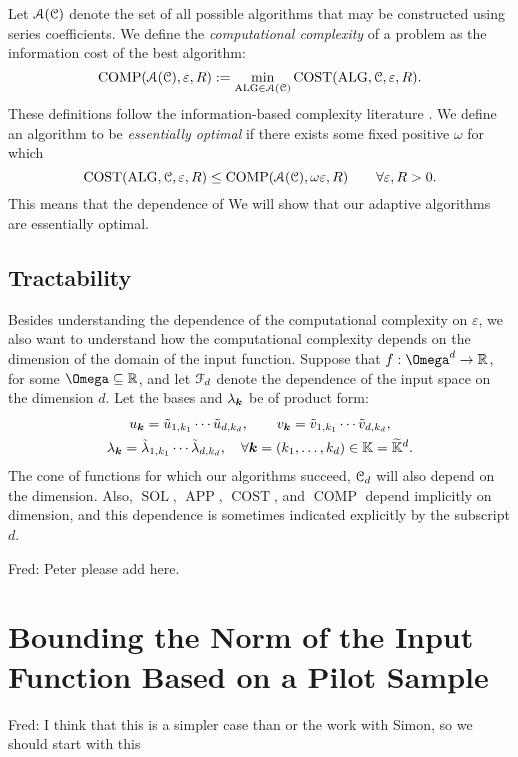 \documentclass[USenglish]{article}
\DeclareMathOperator{\SOL}{SOL}
\DeclareMathOperator{\APP}{APP}
\DeclareMathOperator{\ALG}{ALG}
\DeclareMathOperator{\COST}{COST}
\DeclareMathOperator{\COMP}{COMP}
\newcommand{\tu}{\Tilde{u}}
\newcommand{\tv}{\Tilde{v}}
\newcommand{\tlambda}{\Tilde{\lambda}}
\newcommand{\tbbK}{\widetilde{\bbK}}
\newcommand{\FredNote}[1]{{\color{blue}Fred: #1}}
\begin{document}
Let ${\mathcal{A}}({\mathcal{C}})$ denote the set of all possible algorithms that may be constructed using series coefficients.  We define the \emph{computational complexity} of a problem as the information cost of the best algorithm:
\begin{equation*}
    \COMP(\calA(\calC), \varepsilon,R) := \min_{\ALG \in \calA(\calC)} \COST(\ALG, \calC, \varepsilon,R) .
\end{equation*}
These definitions follow the information-based complexity literature \cite{TraWer98, TraWasWoz88}.
We define an algorithm to be \emph{essentially optimal} if there exists some fixed positive $\omega$ for which
\begin{equation*}
    \COST(\ALG, \calC, \varepsilon,R) \le \COMP(\calA(\calC), \omega \varepsilon,R) \qquad \forall \varepsilon,R > 0.
\end{equation*}
This means that the dependence of 
We will show that our adaptive algorithms are essentially optimal.

\subsection{Tractability}
Besides understanding the dependence of the computational complexity on $\varepsilon$, we also want to understand how the computational complexity depends on the dimension of the domain of the input function.  Suppose that $f: \Omega^d \to \R$, for some $\Omega \subseteq \R$, and let ${\mathcal{F}}_d$ denote the dependence of the input space on the dimension $d$.  Let the bases and $\lambda_{{\boldsymbol{k}}}$ be of product form:
\begin{gather*}
    u_{\bsk} = \tu_{1,k_1} \cdots \tu_{d,k_d}, \qquad  v_{\bsk} = \tv_{1,k_1} \cdots \tv_{d,k_d}, \\ 
    \lambda_{\bsk} = \tlambda_{1,k_1} \cdots \tlambda_{d,k_d}, \quad \forall \bsk = (k_1, \ldots, k_d) \in \bbK = \tbbK^d.
\end{gather*}
The cone of functions for which our algorithms succeed, ${\mathcal{C}}_d$ will also depend on the dimension.  Also, $\SOL$, $\APP$, $\COST$, and $\COMP$ depend implicitly on dimension, and this dependence is sometimes indicated explicitly by the subscript $d$.

\FredNote{Peter please add here.}



\section{Bounding the Norm of the Input Function Based on a Pilot Sample} 
\FredNote{I think that this is a simpler case than \cite{DinHic20a} or the work with Simon, so we should start with this}
\end{document}
